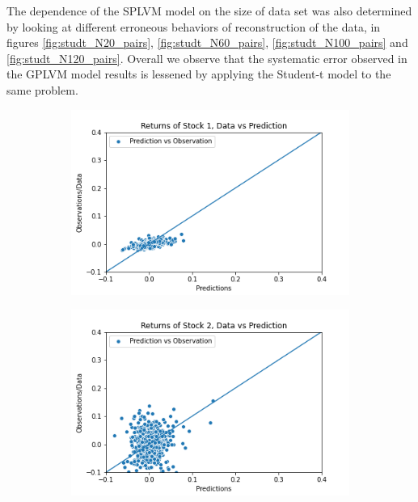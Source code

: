 The dependence of the SPLVM model on the size of data set was also determined by looking at different erroneous behaviors of reconstruction of the data, in figures \ref{fig:studt_N20_pairs}, \ref{fig:studt_N60_pairs}, \ref{fig:studt_N100_pairs} and \ref{fig:studt_N120_pairs}. Overall we observe that the systematic error observed in the GPLVM model results is lessened by applying the Student-t model to the same problem. 
\begin{figure}%
	\centering
	\begin{subfigure}[l]{0.3\textwidth}
		\includegraphics[width=\textwidth]{img/07_1/N20/Q1_kernel1_stock1_scatter.png}
	\end{subfigure}
	\begin{subfigure}[c]{0.3\textwidth}
		\includegraphics[width=\textwidth]{img/07_1/N20/Q1_kernel1_stock2_scatter.png}
	\end{subfigure}

\end{figure}
